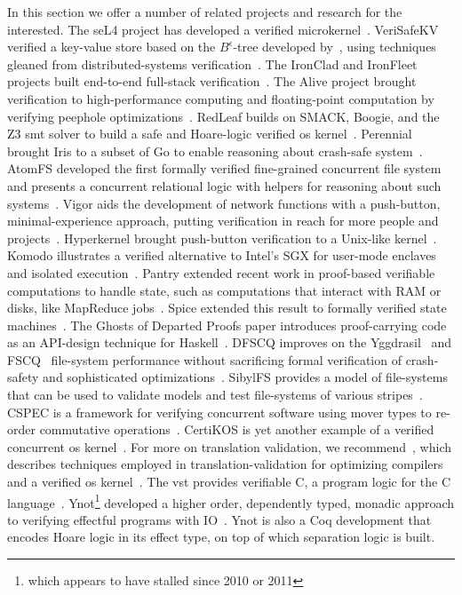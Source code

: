 In this section we offer a number of related projects and research for the
interested. The seL4 project has developed a verified
microkernel~\cite{Klein_EHACDEEKNSTW_09,Klein_AEHCDEEKNSTW_10,Klein_AEMSKH_14,Klein_AKMHF_18}.
VeriSafeKV verified a key-value store based on the \(B^\epsilon\)-tree developed
by~\cite{188458}, using techniques gleaned from distributed-systems
verification~\cite{258969}. The IronClad and IronFleet projects built end-to-end
full-stack verification~\cite{hawblitzel2014ironclad,hawblitzel2015ironfleet}.
The Alive project brought verification to high-performance computing and
floating-point computation by verifying peephole
optimizations~\cite{Lopes_2018,Menendez_2016,Lopes_2015}. RedLeaf builds on
SMACK, Boogie, and the Z3 \gls{smt} solver to build a safe and Hoare-logic
verified \gls{os} kernel~\cite{Narayanan_2019,Narayan_2020}. Perennial brought
Iris to a subset of Go to enable reasoning about crash-safe
system~\cite{Chajed_2019}. AtomFS developed the first formally verified
fine-grained concurrent file system and presents a concurrent relational logic
with helpers for reasoning about such systems~\cite{Zou_2019}. Vigor aids the
development of network functions with a push-button, minimal-experience
approach, putting verification in reach for more people and
projects~\cite{Zaostrovnykh_2019}. Hyperkernel brought push-button verification
to a Unix-like kernel~\cite{Nelson_2017}. Komodo illustrates a verified
alternative to Intel's SGX for user-mode enclaves and isolated
execution~\cite{Ferraiuolo_2017}. Pantry extended recent work in proof-based
verifiable computations to handle state, such as computations that interact with
RAM or disks, like MapReduce jobs~\cite{Braun_2013}. Spice extended this result
to formally verified state machines~\cite{222621}. The Ghosts of Departed Proofs
paper introduces proof-carrying code as an API-design technique for
Haskell~\cite{Noonan_2018}. DFSCQ improves on the
Yggdrasil~\cite{Sigurbjarnarson_2016} and FSCQ~\cite{Chen_2015} file-system
performance without sacrificing formal verification of crash-safety and
sophisticated optimizations~\cite{Chen_2017}. SibylFS provides a model of
file-systems that can be used to validate models and test file-systems of
various stripes~\cite{Ridge_2015}. CSPEC is a framework for verifying concurrent
software using mover types to re-order commutative operations~\cite{222565}.
CertiKOS is yet another example of a verified concurrent \gls{os}
kernel~\cite{199344}. For more on translation validation, we
recommend~\cite{Pnueli_1998}, which describes techniques employed in
translation-validation for optimizing compilers~\cite{Necula_2000} and a
verified \gls{os} kernel~\cite{Sewell_2013}. The \gls{vst} provides verifiable
C, a program logic for the C language~\cite{VST,Appel_2011}. Ynot\footnote{which
appears to have stalled since 2010 or 2011} developed a higher order,
dependently typed, monadic approach to verifying effectful programs with
IO~\cite{Nanevski08ynot:reasoning}. Ynot is also a Coq development that encodes
Hoare logic in its effect type, on top of which separation logic is built.
